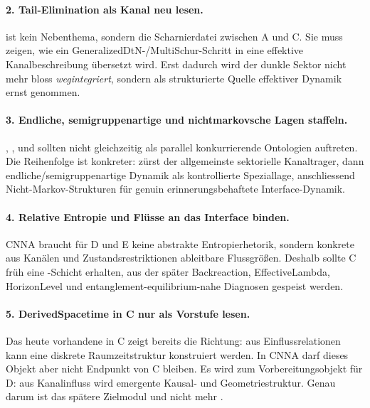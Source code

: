 \documentclass[11pt,a4paper]{article}
\let\oldpath\path
\renewcommand{\path}[1]{\oldpath{#1}}
\begin{document}
\paragraph{2. Tail-Elimination als Kanal neu lesen.}
 ist kein Nebenthema, sondern die Scharnierdatei zwischen A und C.
Sie muss zeigen, wie ein GeneralizedDtN-/MultiSchur-Schritt in eine effektive Kanalbeschreibung
übersetzt wird. Erst dadurch wird der dunkle Sektor nicht mehr bloss \emph{wegintegriert}, sondern als
strukturierte Quelle effektiver Dynamik ernst genommen.

\paragraph{3. Endliche, semigruppenartige und nichtmarkovsche Lagen staffeln.}
, ,  und  sollten nicht gleichzeitig als
parallel konkurrierende Ontologien auftreten. Die Reihenfolge ist konkreter: zürst der allgemeinste
sektorielle Kanaltrager, dann endliche/semigruppenartige Dynamik als kontrollierte Speziallage,
anschliessend Nicht-Markov-Strukturen für genuin erinnerungsbehaftete Interface-Dynamik.

\paragraph{4. Relative Entropie und Flüsse an das Interface binden.}
CNNA braucht für D und E keine abstrakte Entropierhetorik, sondern konkrete aus Kanälen und
Zustandsrestriktionen ableitbare Flussgrößen. Deshalb sollte C früh eine
-Schicht erhalten, aus der später Backreaction, EffectiveLambda,
HorizonLevel und entanglement-equilibrium-nahe Diagnosen gespeist werden.

\paragraph{5. DerivedSpacetime in C nur als Vorstufe lesen.}
Das heute vorhandene  in C zeigt bereits die Richtung: aus
Einflussrelationen kann eine diskrete Raumzeitstruktur konstruiert werden. In CNNA darf dieses Objekt
aber nicht Endpunkt von C bleiben. Es wird zum Vorbereitungsobjekt für D: aus Kanalinfluss wird
emergente Kausal- und Geometriestruktur. Genau darum ist das spätere Zielmodul
 und nicht mehr .
\end{document}
